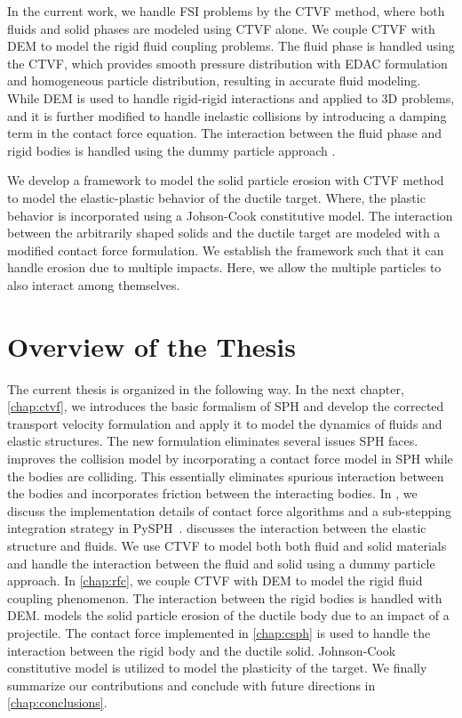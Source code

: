 In the current work, we handle FSI problems by the CTVF method, where both
fluids and solid phases are modeled using CTVF alone. We couple CTVF with DEM to
model the rigid fluid coupling problems. The fluid phase is handled using the
CTVF, which provides smooth pressure distribution with EDAC formulation and
homogeneous particle distribution, resulting in accurate fluid modeling. While
DEM is used to handle rigid-rigid interactions and applied to 3D problems, and
it is further modified to handle inelastic collisions by introducing a damping
term in the contact force equation. The interaction between the fluid phase and
rigid bodies is handled using the dummy particle approach \parencite{Adami2012}.

We develop a framework to model the solid particle erosion with CTVF method to
model the elastic-plastic behavior of the ductile target. Where, the plastic
behavior is incorporated using a Johson-Cook constitutive model. The interaction
between the arbitrarily shaped solids and the ductile target are modeled with a
modified contact force formulation. We establish the framework such that it can
handle erosion due to multiple impacts. Here, we allow the multiple particles
to also interact among themselves.


\section{Overview of the Thesis}
The current thesis is organized in the following way. In the next chapter,
\cref{chap:ctvf}, we introduces the basic formalism of SPH and develop the
corrected transport velocity formulation and apply it to model the dynamics of
fluids and elastic structures. The new formulation eliminates several issues SPH
faces.  improves the collision model by incorporating a contact
force model in SPH while the bodies are colliding. This essentially eliminates
spurious interaction between the bodies and incorporates friction between the
interacting bodies. In , we discuss the
implementation details of contact force algorithms and a sub-stepping
integration strategy in PySPH~\parencite{pysph2020}.  discusses the
interaction between the elastic structure and fluids. We use CTVF to model both
both fluid and solid materials and handle the interaction between the fluid and
solid using a dummy particle approach. In \cref{chap:rfc}, we couple CTVF with
DEM to model the rigid fluid coupling phenomenon. The interaction between the
rigid bodies is handled with DEM.  models the solid particle
erosion of the ductile body due to an impact of a projectile. The contact
force implemented in \cref{chap:csph} is used to handle the interaction between
the rigid body and the ductile solid. Johnson-Cook constitutive model is
utilized to model the plasticity of the target. We finally summarize our
contributions and conclude with future directions in \cref{chap:conclusions}.


